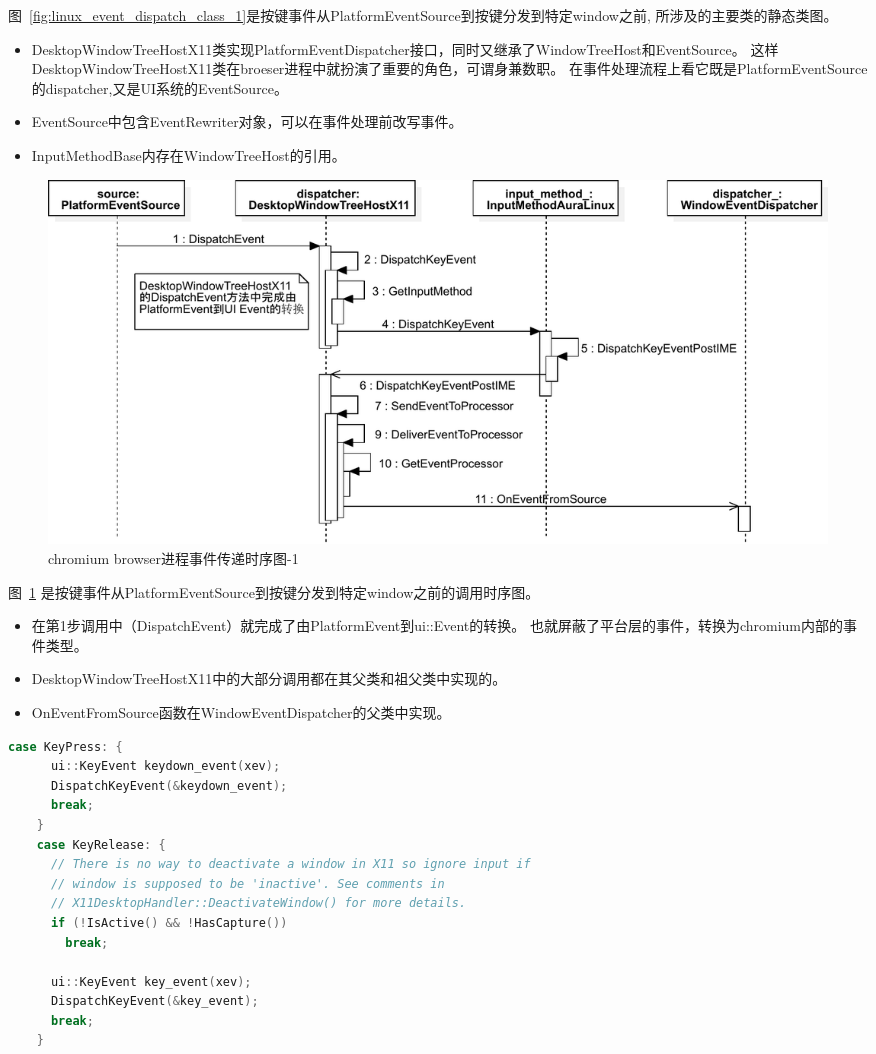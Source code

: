 图~\ref{fig:linux_event_dispatch_class_1}是按键事件从PlatformEventSource到按键分发到特定window之前,
所涉及的主要类的静态类图。
\begin{itemize}
  \item DesktopWindowTreeHostX11类实现PlatformEventDispatcher接口，同时又继承了WindowTreeHost和EventSource。
  这样DesktopWindowTreeHostX11类在broeser进程中就扮演了重要的角色，可谓身兼数职。
  在事件处理流程上看它既是PlatformEventSource的dispatcher,又是UI系统的EventSource。
  \item EventSource中包含EventRewriter对象，可以在事件处理前改写事件。
  \item InputMethodBase内存在WindowTreeHost的引用。
\end{itemize}

\begin{figure}[H] 
  \centering 
  \includegraphics[width=\textwidth]{image/event_study/browser_event_dispatch_sequence_1.pdf} 
  \caption{chromium browser进程事件传递时序图-1} \label{fig:browser_event_dispatch_sequence_1} 
\end{figure}

图~\ref{fig:browser_event_dispatch_sequence_1}
是按键事件从PlatformEventSource到按键分发到特定window之前的调用时序图。

\begin{itemize}
  \item 在第1步调用中（DispatchEvent）就完成了由PlatformEvent到ui::Event的转换。
  也就屏蔽了平台层的事件，转换为chromium内部的事件类型。
  \item DesktopWindowTreeHostX11中的大部分调用都在其父类和祖父类中实现的。
  \item OnEventFromSource函数在WindowEventDispatcher的父类中实现。
\end{itemize}

\begin{spacing}{1.0}
\begin{lstlisting}[language={C++}]
    case KeyPress: {
      ui::KeyEvent keydown_event(xev);
      DispatchKeyEvent(&keydown_event);
      break;
    }
    case KeyRelease: {
      // There is no way to deactivate a window in X11 so ignore input if
      // window is supposed to be 'inactive'. See comments in
      // X11DesktopHandler::DeactivateWindow() for more details.
      if (!IsActive() && !HasCapture())
        break;

      ui::KeyEvent key_event(xev);
      DispatchKeyEvent(&key_event);
      break;
    }
\end{lstlisting}
\end{spacing}

